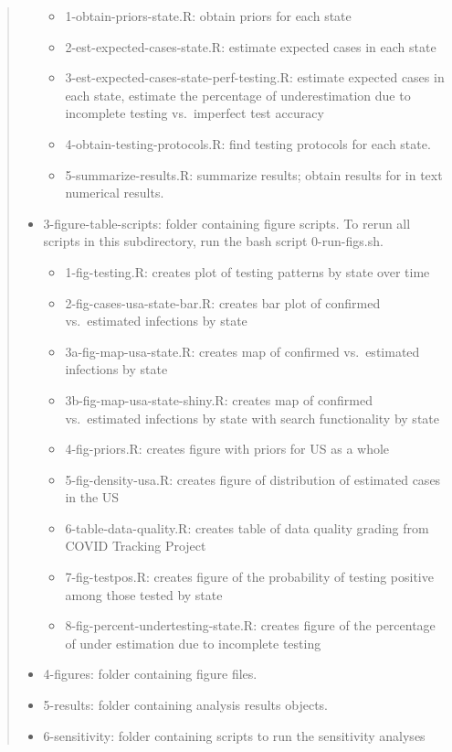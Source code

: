 \documentclass[
]{book}
\begin{document}
\begin{quote}
\begin{itemize}
  \begin{itemize}
  \item
    1-obtain-priors-state.R: obtain priors for each state
  \item
    2-est-expected-cases-state.R: estimate expected cases in each state
  \item
    3-est-expected-cases-state-perf-testing.R: estimate expected cases in each state, estimate the percentage of underestimation due to incomplete testing vs.~imperfect test accuracy
  \item
    4-obtain-testing-protocols.R: find testing protocols for each state.
  \item
    5-summarize-results.R: summarize results; obtain results for in text numerical results.
  \end{itemize}
\item
  3-figure-table-scripts: folder containing figure scripts. To rerun all scripts in this subdirectory, run the bash script 0-run-figs.sh.

  \begin{itemize}
  \item
    1-fig-testing.R: creates plot of testing patterns by state over time
  \item
    2-fig-cases-usa-state-bar.R: creates bar plot of confirmed vs.~estimated infections by state
  \item
    3a-fig-map-usa-state.R: creates map of confirmed vs.~estimated infections by state
  \item
    3b-fig-map-usa-state-shiny.R: creates map of confirmed vs.~estimated infections by state with search functionality by state
  \item
    4-fig-priors.R: creates figure with priors for US as a whole
  \item
    5-fig-density-usa.R: creates figure of distribution of estimated cases in the US
  \item
    6-table-data-quality.R: creates table of data quality grading from COVID Tracking Project
  \item
    7-fig-testpos.R: creates figure of the probability of testing positive among those tested by state
  \item
    8-fig-percent-undertesting-state.R: creates figure of the percentage of under estimation due to incomplete testing
  \end{itemize}
\item
  4-figures: folder containing figure files.
\item
  5-results: folder containing analysis results objects.
\item
  6-sensitivity: folder containing scripts to run the sensitivity analyses
\end{itemize}


\end{quote}
\end{document}
